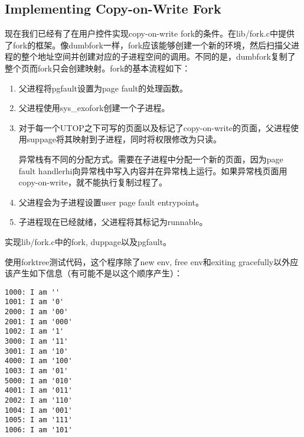 \subsection{Implementing Copy-on-Write Fork}
\par 现在我们已经有了在用户控件实现copy-on-write fork的条件。在lib/fork.c中提供了fork的框架。像dumbfork一样，fork应该能够创建一个新的环境，然后扫描父进程的整个地址空间并创建对应的子进程空间的调用。不同的是，dumbfork复制了整个页而fork只会创建映射。fork的基本流程如下：
\begin{enumerate}
    \item 父进程将pgfault设置为page fault的处理函数。
    \item 父进程使用sys\_exofork创建一个子进程。
    \item 对于每一个UTOP之下可写的页面以及标记了copy-on-write的页面，父进程使用suppage将其映射到子进程，同时将权限修改为只读。
        \par 异常栈有不同的分配方式。需要在子进程中分配一个新的页面，因为page fault handlerhi向异常栈中写入内容并在异常栈上运行。如果异常栈页面用copy-on-write，就不能执行复制过程了。
    \item 父进程会为子进程设置user page fault entrypoint。
    \item 子进程现在已经就绪，父进程将其标记为runnable。
\end{enumerate}
\begin{exerciseEnv}{12}
    \par 实现lib/fork.c中的fork, duppage以及pgfault。
    \par 使用forktree测试代码，这个程序除了new env, free env和exiting gracefully以外应该产生如下信息（有可能不是以这个顺序产生）：
    \begin{lstlisting}[numbers=none]
1000: I am ''
1001: I am '0'
2000: I am '00'
2001: I am '000'
1002: I am '1'
3000: I am '11'
3001: I am '10'
4000: I am '100'
1003: I am '01'
5000: I am '010'
4001: I am '011'
2002: I am '110'
1004: I am '001'
1005: I am '111'
1006: I am '101'
    \end{lstlisting}
\end{exerciseEnv}
